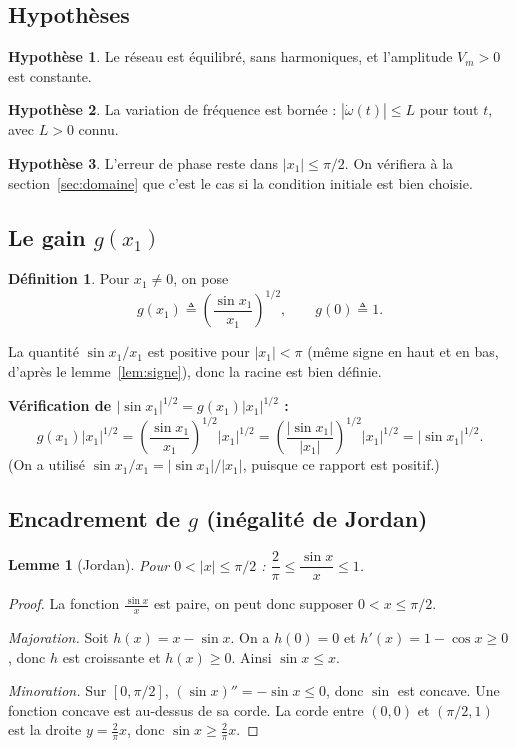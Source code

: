 \documentclass[11pt,a4paper]{article}
\numberwithin{equation}{section}
\theoremstyle{plain}
\newtheorem{lemme}[theoreme]{Lemme}
\theoremstyle{definition}
\newtheorem{definition}[theoreme]{Définition}
\newtheorem{hypothese}{Hypothèse}
\theoremstyle{remark}
\begin{document}
\subsection{Hypothèses}
\begin{hypothese}\label{H1}
Le réseau est équilibré, sans harmoniques, et l'amplitude $V_m>0$ est constante.
\end{hypothese}
\begin{hypothese}\label{H2}
La variation de fréquence est bornée : $|\dot\omega(t)|\le L$ pour tout $t$, avec $L>0$ connu.
\end{hypothese}
\begin{hypothese}\label{H3}
L'erreur de phase reste dans $|x_1|\le\pi/2$. On vérifiera à la section~\ref{sec:domaine}
que c'est le cas si la condition initiale est bien choisie.
\end{hypothese}

\subsection{Le gain $g(x_1)$}
\begin{definition}
Pour $x_1\neq0$, on pose
\begin{equation}
g(x_1) \triangleq \left(\frac{\sin x_1}{x_1}\right)^{1/2},\qquad g(0)\triangleq 1 .
\end{equation}
\end{definition}
La quantité $\sin x_1/x_1$ est positive pour $|x_1|<\pi$ (même signe en haut et en bas,
d'après le lemme~\ref{lem:signe}), donc la racine est bien définie.

\textbf{Vérification de $|\sin x_1|^{1/2} = g(x_1)|x_1|^{1/2}$ :}
\begin{equation}
g(x_1)|x_1|^{1/2} = \left(\frac{\sin x_1}{x_1}\right)^{1/2}|x_1|^{1/2}
= \left(\frac{|\sin x_1|}{|x_1|}\right)^{1/2}|x_1|^{1/2} = |\sin x_1|^{1/2}.
\end{equation}
(On a utilisé $\sin x_1/x_1 = |\sin x_1|/|x_1|$, puisque ce rapport est positif.)

\subsection{Encadrement de $g$ (inégalité de Jordan)}
\begin{lemme}[Jordan]\label{lem:jordan}
Pour $0<|x|\le\pi/2$ : $\dfrac{2}{\pi}\le\dfrac{\sin x}{x}\le1$.
\end{lemme}
\begin{proof}
La fonction $\frac{\sin x}{x}$ est paire, on peut donc supposer $0<x\le\pi/2$.

\emph{Majoration.} Soit $h(x)=x-\sin x$. On a $h(0)=0$ et $h'(x)=1-\cos x\ge0$,
donc $h$ est croissante et $h(x)\ge0$. Ainsi $\sin x\le x$.

\emph{Minoration.} Sur $[0,\pi/2]$, $(\sin x)''=-\sin x\le0$, donc $\sin$ est concave.
Une fonction concave est au-dessus de sa corde. La corde entre $(0,0)$ et $(\pi/2,1)$ est la
droite $y=\frac{2}{\pi}x$, donc $\sin x\ge\frac{2}{\pi}x$.
\end{proof}
\end{document}
